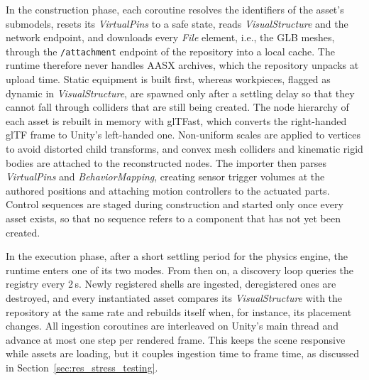 \documentclass{ieeeojies}
\begin{document}
In the construction phase, each coroutine resolves the identifiers of the asset's submodels, resets its \textit{VirtualPins} to a safe state, reads \textit{VisualStructure} and the network endpoint, and downloads every \textit{File} element, i.e., the GLB meshes, through the \texttt{/attachment} endpoint of the repository into a local cache. The runtime therefore never handles AASX archives, which the repository unpacks at upload time. Static equipment is built first, whereas workpieces, flagged as dynamic in \textit{VisualStructure}, are spawned only after a settling delay so that they cannot fall through colliders that are still being created. The node hierarchy of each asset is rebuilt in memory with glTFast, which converts the right-handed glTF frame to Unity's left-handed one. Non-uniform scales are applied to vertices to avoid distorted child transforms, and convex mesh colliders and kinematic rigid bodies are attached to the reconstructed nodes. The importer then parses \textit{VirtualPins} and \textit{BehaviorMapping}, creating sensor trigger volumes at the authored positions and attaching motion controllers to the actuated parts. Control sequences are staged during construction and started only once every asset exists, so that no sequence refers to a component that has not yet been created.

In the execution phase, after a short settling period for the physics engine, the runtime enters one of its two modes. From then on, a discovery loop queries the registry every 2\,s. Newly registered shells are ingested, deregistered ones are destroyed, and every instantiated asset compares its \textit{VisualStructure} with the repository at the same rate and rebuilds itself when, for instance, its placement changes. All ingestion coroutines are interleaved on Unity's main thread and advance at most one step per rendered frame. This keeps the scene responsive while assets are loading, but it couples ingestion time to frame time, as discussed in Section~\ref{sec:res_stress_testing}.
\end{document}
